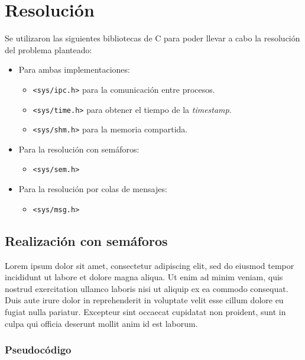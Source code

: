 \section{Resolución}

Se utilizaron las siguientes bibliotecas de C para poder llevar a cabo la resolución del problema planteado:
\begin{itemize}
    \item Para ambas implementaciones:
    \begin{itemize}
        \item \texttt{<sys/ipc.h>} para la comunicación entre procesos.
        \item \texttt{<sys/time.h>} para obtener el tiempo de la \textit{timestamp}.
        \item \texttt{<sys/shm.h>} para la memoria compartida.
    \end{itemize}
    \item Para la resolución con semáforos:
    \begin{itemize}
        \item \texttt{<sys/sem.h>}
    \end{itemize}
    \item Para la resolución por colas de mensajes:
    \begin{itemize}
        \item \texttt{<sys/msg.h>}
    \end{itemize}
\end{itemize}

\subsection{Realización con semáforos}

Lorem ipsum dolor sit amet, consectetur adipiscing elit, sed do eiusmod tempor incididunt ut labore et dolore magna aliqua. Ut enim ad minim veniam, quis nostrud exercitation ullamco laboris nisi ut aliquip ex ea commodo consequat. Duis aute irure dolor in reprehenderit in voluptate velit esse cillum dolore eu fugiat nulla pariatur. Excepteur sint occaecat cupidatat non proident, sunt in culpa qui officia deserunt mollit anim id est laborum.

\subsubsection{Pseudocódigo}

